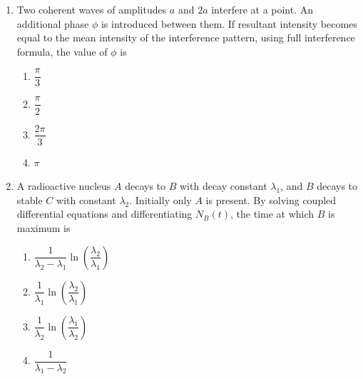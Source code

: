 \documentclass[12pt]{article}
\begin{document}
\begin{enumerate}[leftmargin=*]
\begin{center}
\end{center}

The final image

\begin{enumerate}
\item coincides with object
\item forms at $2f$ from lens
\item forms at $f$ behind lens
\item forms at infinity
\end{enumerate}

\item Two coherent waves of amplitudes $a$ and $2a$ interfere at a point. An additional phase $\phi$ is introduced between them. If resultant intensity becomes equal to the mean intensity of the interference pattern, using full interference formula, the value of $\phi$ is

\begin{enumerate}
\item $\dfrac{\pi}{3}$
\item $\dfrac{\pi}{2}$
\item $\dfrac{2\pi}{3}$
\item $\pi$
\end{enumerate}

\item A radioactive nucleus $A$ decays to $B$ with decay constant $\lambda_1$, and $B$ decays to stable $C$ with constant $\lambda_2$. Initially only $A$ is present. By solving coupled differential equations and differentiating $N_B(t)$, the time at which $B$ is maximum is

\begin{enumerate}
\item $\dfrac{1}{\lambda_2-\lambda_1}\ln\left(\dfrac{\lambda_2}{\lambda_1}\right)$
\item $\dfrac{1}{\lambda_1}\ln\left(\dfrac{\lambda_2}{\lambda_1}\right)$
\item $\dfrac{1}{\lambda_2}\ln\left(\dfrac{\lambda_1}{\lambda_2}\right)$
\item $\dfrac{1}{\lambda_1-\lambda_2}$
\end{enumerate}


\end{enumerate}
\end{document}
